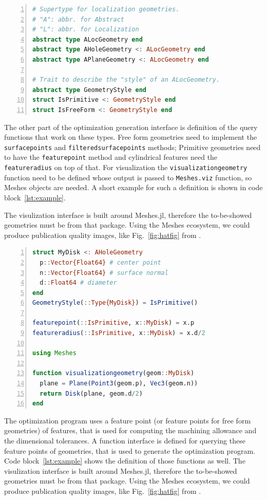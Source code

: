 \documentclass{juliacon}
\begin{document}
\begin{lstlisting}[language = Julia, numbers=left, label={lst:def-types}, caption={Draft of the type system used by \texttt{BlankLocalizationCore.jl}.}]
# Supertype for localization geometries.
# "A": abbr. for Abstract
# "L": abbr. for Localization
abstract type ALocGeometry end
abstract type AHoleGeometry <: ALocGeometry end
abstract type APlaneGeometry <: ALocGeometry end

# Trait to describe the "style" of an ALocGeometry.
abstract type GeometryStyle end
struct IsPrimitive <: GeometryStyle end
struct IsFreeForm <: GeometryStyle end
\end{lstlisting}

The other part of the optimization generation interface is definition of the query functions that work on these types.
Free form geometries need to implement the \texttt{surfacepoints} and \texttt{filteredsurfacepoints} methods;
Primitive geometries need to have the \texttt{featurepoint} method and cylindrical features need the \texttt{featureradius} on top of that.
For visualization the \texttt{visualizationgeometry} function need to be defined whose output is passed to \texttt{Meshes.viz} function, so Meshes objects are needed.
A short example for such a definition is shown in code block~\ref{lst:example}.

The visulization interface is built around Meshes.jl, therefore the to-be-showed geometries must be from that package.
Using the Meshes ecosystem, we could produce publication quality images, like Fig.~\ref{fig:hatfig} from \cite{cserteg:2023_Annals}.

\begin{lstlisting}[language = Julia, numbers=left, label={lst:example}, caption={Defining a new type.}]
struct MyDisk <: AHoleGeometry
  p::Vector{Float64} # center point
  n::Vector{Float64} # surface normal
  d::Float64 # diameter
end
GeometryStyle(::Type{MyDisk}) = IsPrimitive()

featurepoint(::IsPrimitive, x::MyDisk) = x.p
featureradius(::IsPrimitive, x::MyDisk) = x.d/2

using Meshes

function visualizationgeometry(geom::MyDisk)
  plane = Plane(Point3(geom.p), Vec3(geom.n))
  return Disk(plane, geom.d/2)
end
\end{lstlisting}



The optimization program uses a feature point (or feature points for free form geometries) of features, that is used for computing the machining allowance and the dimensional tolerances.
A function interface is defined for querying these feature points of geometries, that is used to generate the optimization program.
Code block~\ref{lst:example} shows the definition of those functions as well.
The visulization interface is built around Meshes.jl, therefore the to-be-showed geometries must be from that package.
Using the Meshes ecosystem, we could produce publication quality images, like Fig.~\ref{fig:hatfig} from \cite{cserteg:2023_Annals}.
\end{document}
